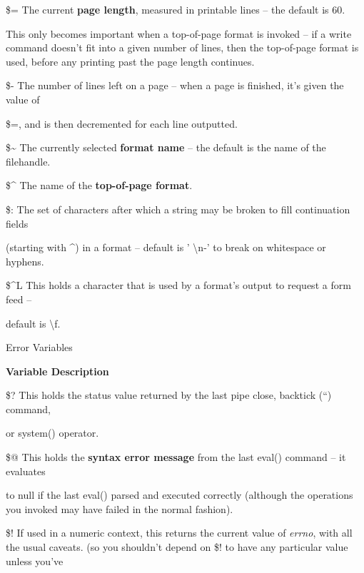 \documentclass[a4paper,11pt]{book}
\begin{document}
\noindent \$= The current \textbf{page length}, measured in printable lines -- the default is 60.

\noindent This only becomes important when a top-of-page format is invoked -- if a write command doesn't fit into a given number of lines, then the top-of-page format is used, before any printing past the page length continues.

\noindent \$- The number of lines left on a page -- when a page is finished, it's given the value of

\noindent \$=, and is then decremented for each line outputted.

\noindent \$\~{} The currently selected \textbf{format name }-- the default is the name of the filehandle.

\noindent \$\^{} The name of the \textbf{top-of-page format}.

\noindent \$: The set of characters after which a string may be broken to fill continuation fields

\noindent (starting with \^{}) in a format -- default is '   \textbackslash n-' to break on whitespace or hyphens.

\noindent \$\^{}L This holds a character that is used by a format's output to request a form feed --

\noindent default is \textbackslash f.

\noindent 

\noindent 

\noindent 

\noindent Error Variables

\noindent 

\noindent \textbf{Variable Description}

\noindent 

\noindent \$? This holds the status value returned by the last pipe close, backtick (``) command,

\noindent or system() operator.

\noindent 

\noindent \$@ This holds the \textbf{syntax error message }from the last eval() command -- it evaluates

\noindent to null if the last eval() parsed and executed correctly (although the operations you invoked may have failed in the normal fashion).

\noindent \eject 

\noindent \$! If used in a numeric context, this returns the current value of \textit{errno}, with all the usual caveats. (so you shouldn't depend on \$! to have any particular value unless you've
\end{document}
